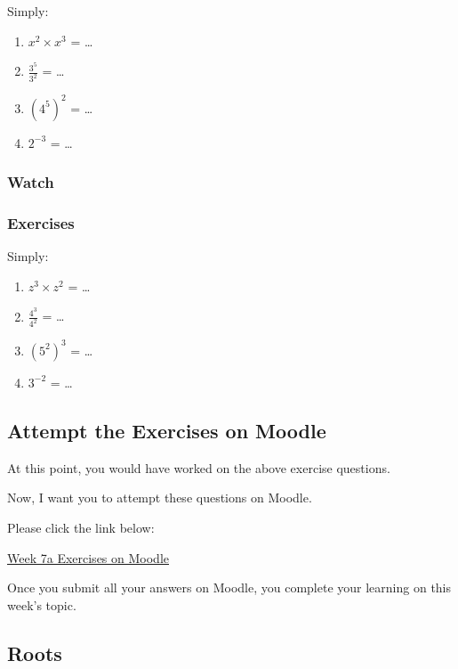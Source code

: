 \documentclass[
  letterpaper,
  DIV=11,
  numbers=noendperiod]{scrartcl}
\begin{document}
Simply:

\begin{enumerate}
\def\labelenumi{\arabic{enumi}.}
\item
  \(x^2 \times x^3\) = \ldots{}
\item
  \(\frac{3^5}{3^2}\) = \ldots{}
\item
  \((4^5)^2\) = \ldots{}
\item
  \(2^{-3}\) = \ldots{}
\end{enumerate}

\hypertarget{watch}{%
\subsubsection{Watch}\label{watch}}

\hypertarget{exercises}{%
\subsubsection{Exercises}\label{exercises}}

Simply:

\begin{enumerate}
\def\labelenumi{\arabic{enumi}.}
\item
  \(z^3 \times z^2\) = \ldots{}
\item
  \(\frac{4^3}{4^2}\) = \ldots{}
\item
  \((5^2)^3\) = \ldots{}
\item
  \(3^{-2}\) = \ldots{}
\end{enumerate}

\hypertarget{attempt-the-exercises-on-moodle}{%
\subsection{Attempt the Exercises on
Moodle}\label{attempt-the-exercises-on-moodle}}

At this point, you would have worked on the above exercise questions.

Now, I want you to attempt these questions on Moodle.

Please click the link below:

\href{https://modules.lancaster.ac.uk/mod/quiz/view.php?id=2012499}{Week
7a Exercises on Moodle}

Once you submit all your answers on Moodle, you complete your learning
on this week's topic.

\hypertarget{roots}{%
\subsection{Roots}\label{roots}}
\end{document}
